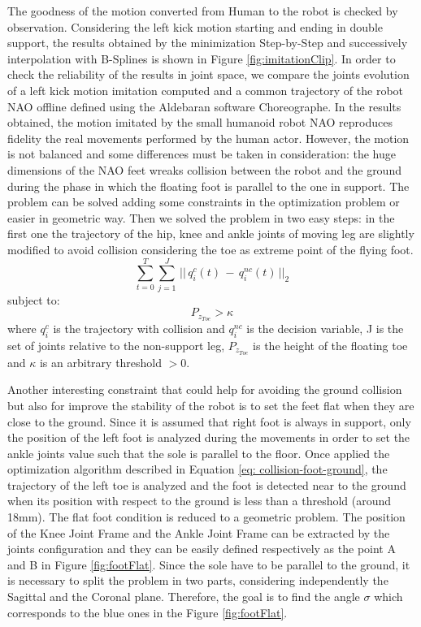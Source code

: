 \documentclass[a4paper, 10pt, conference]{ieeeconf}
\begin{document}
The goodness of the motion converted from Human to the robot is checked by observation.
Considering the left kick motion starting and ending in double support, the results obtained by the minimization Step-by-Step and successively interpolation with B-Splines is shown in Figure \ref{fig:imitationClip}.
In order to check the reliability of the results in joint space, we compare the joints evolution of a left kick motion imitation computed and a common trajectory of the robot NAO offline defined using the Aldebaran software Choreographe. 
In the results obtained, the motion imitated by the small humanoid robot NAO reproduces fidelity the real movements performed by the human actor.
However, the motion is not balanced and some differences must be taken in consideration: the huge dimensions of the NAO feet wreaks collision between the robot and the ground during the phase in which the floating foot is parallel to the one in support.
The problem can be solved adding some constraints in the optimization problem or easier in geometric way.
Then we solved the problem in two easy steps: in the first one the  trajectory of the hip, knee and ankle joints of moving leg are slightly modified to avoid collision considering the toe as extreme point of the flying foot. 
\begin{equation}
\sum^{T}_{t=0} \sum^J_{j=1} \, || \, q_i^c(t) \, - \, q_i^{nc}(t) \, ||_2
\label{eq: collision-foot-ground}
\end{equation}
subject to:
\begin{equation}
P_{z_{Toe}} > \kappa
\label{eq: collision-foot-ground-constraints}
\end{equation}
where $q_i^c$ is the trajectory with collision and $q_i^{nc}$ is the decision variable, J is the set of joints relative to the non-support leg, $P_{z_{Toe}}$ is the height of the floating toe and $\kappa$ is an arbitrary threshold $ > 0$. 

Another interesting constraint that could help for avoiding the ground collision but also for improve the stability of the robot is to set the feet flat when they are close to the ground. Since it is assumed that right foot is always in support, only the position of the left foot is analyzed during the movements in order to set the ankle joints value such that the sole is parallel to the 
floor. Once applied the optimization algorithm described
in Equation \eqref{eq: collision-foot-ground}, the trajectory of the left toe is analyzed and the foot is detected near to the ground when its position with respect to the ground is less than a threshold (around 18mm).
The flat foot condition is reduced to a geometric problem. The position of the Knee Joint Frame and the Ankle Joint Frame can be extracted by the joints configuration and they can be easily defined respectively as the point A and B in Figure \ref{fig:footFlat}. Since the sole have to be parallel to the ground, it is necessary to split the problem in two parts, considering independently the Sagittal and the Coronal plane. Therefore, the goal is to find the angle $\sigma$ which corresponds to the blue ones in the Figure \ref{fig:footFlat}.
 
\end{document}
